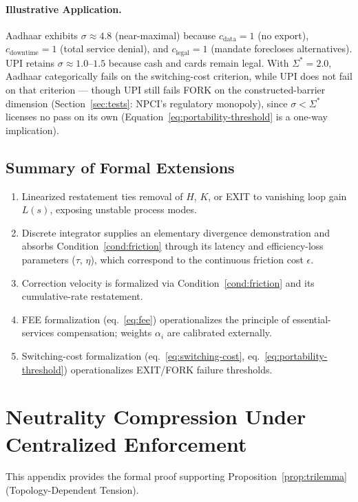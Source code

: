 \documentclass{article}
\begin{document}
\paragraph{Illustrative Application.} Aadhaar exhibits $\sigma \approx 4.8$ (near-maximal) because $c_{\text{data}} = 1$ (no export), $c_{\text{downtime}} = 1$ (total service denial), and $c_{\text{legal}} = 1$ (mandate forecloses alternatives). UPI retains $\sigma \approx 1.0$--$1.5$ because cash and cards remain legal. With $\Sigma^* = 2.0$, Aadhaar categorically fails on the switching-cost criterion, while UPI does not fail on that criterion --- though UPI still fails FORK on the constructed-barrier dimension (Section~\ref{sec:tests}: NPCI's regulatory monopoly), since $\sigma < \Sigma^*$ licenses no pass on its own (Equation~\ref{eq:portability-threshold} is a one-way implication).

\subsection{Summary of Formal Extensions}

\begin{enumerate}
    \item Linearized restatement ties removal of $H$, $K$, or EXIT to vanishing loop gain $L(s)$, exposing unstable process modes.
    \item Discrete integrator supplies an elementary divergence demonstration and absorbs Condition~\ref{cond:friction} through its latency and efficiency-loss parameters ($\tau$, $\eta$), which correspond to the continuous friction cost $\epsilon$.
    \item Correction velocity is formalized via Condition~\ref{cond:friction} and its cumulative-rate restatement.
    \item FEE formalization (eq.~\ref{eq:fee}) operationalizes the principle of essential-services compensation; weights $\alpha_i$ are calibrated externally.
    \item Switching-cost formalization (eq.~\ref{eq:switching-cost}, eq.~\ref{eq:portability-threshold}) operationalizes EXIT/FORK failure thresholds.
\end{enumerate}

\section{Neutrality Compression Under Centralized Enforcement}
\label{appendix:neutrality}

This appendix provides the formal proof supporting Proposition~\ref{prop:trilemma} (Topology-Dependent Tension).
\end{document}
